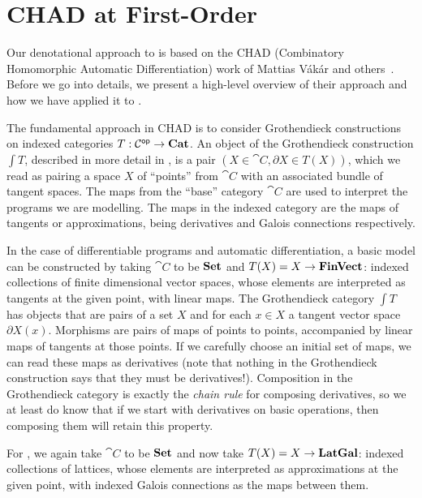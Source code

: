 \section{CHAD at First-Order}
\label{sec:first-order}

Our denotational approach to \GPS is based on the CHAD (Combinatory Homomorphic Automatic Differentiation) work of Mattias Vákár and others~\cite{vákár22,nunes2023}. Before we go into details, we present a high-level overview of their approach and how we have applied it to \GPS.

The fundamental approach in CHAD is to consider Grothendieck constructions on indexed categories $T : \mathcal{C}^{\mathsf{op}} \to \mathbf{Cat}$. An object of the Grothendieck construction $\int T$, described in more detail in , is a pair $(X \in \cat{C}, \partial X \in T(X))$, which we read as pairing a space $X$ of ``points'' from $\cat{C}$ with an associated bundle of tangent spaces. The maps from the ``base'' category $\cat{C}$ are used to interpret the programs we are modelling. The maps in the indexed category are the maps of tangents or approximations, being derivatives and Galois connections respectively.

In the case of differentiable programs and automatic differentiation, a basic model can be constructed by taking $\cat{C}$ to be $\mathbf{Set}$ and $T(X) = X \to \mathbf{FinVect}$: indexed collections of finite dimensional vector spaces, whose elements are interpreted as tangents at the given point, with linear maps. The Grothendieck category $\int T$ has objects that are pairs of a set $X$ and for each $x \in X$ a tangent vector space $\partial X(x)$. Morphisms are pairs of maps of points to points, accompanied by linear maps of tangents at those points. If we carefully choose an initial set of maps, we can read these maps as derivatives (note that nothing in the Grothendieck construction says that they must be derivatives!). Composition in the Grothendieck category is exactly the {\em chain rule} for composing derivatives, so we at least do know that if we start with derivatives on basic operations, then composing them will retain this property.

For \GPS, we again take $\cat{C}$ to be $\mathbf{Set}$ and now take $T(X) = X \to \mathbf{LatGal}$: indexed collections of lattices, whose elements are interpreted as approximations at the given point, with indexed Galois connections as the maps between them.

